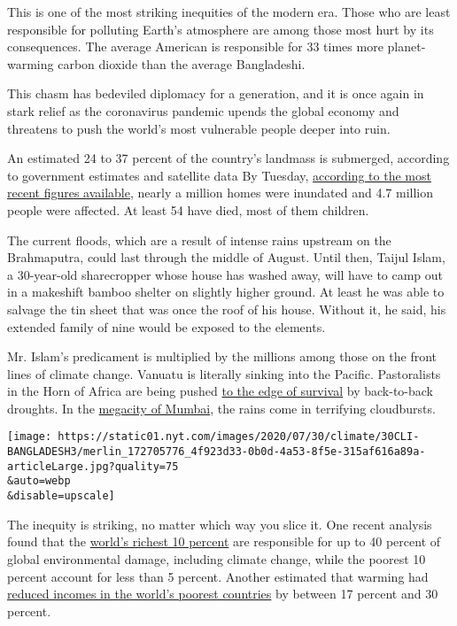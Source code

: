 This is one of the most striking inequities of the modern era. Those who
are least responsible for polluting Earth's atmosphere are among those
most hurt by its consequences. The average American is responsible for
33 times more planet-warming carbon dioxide than the average
Bangladeshi.

This chasm has bedeviled diplomacy for a generation, and it is once
again in stark relief as the coronavirus pandemic upends the global
economy and threatens to push the world's most vulnerable people deeper
into ruin.

An estimated 24 to 37 percent of the country's landmass is submerged,
according to government estimates and satellite data By Tuesday,
\href{https://reliefweb.int/disaster/fl-2020-000161-bgd}{according to
the most recent figures available,} nearly a million homes were
inundated and 4.7 million people were affected. At least 54 have died,
most of them children.

The current floods, which are a result of intense rains upstream on the
Brahmaputra, could last through the middle of August. Until then, Taijul
Islam, a 30-year-old sharecropper whose house has washed away, will have
to camp out in a makeshift bamboo shelter on slightly higher ground. At
least he was able to salvage the tin sheet that was once the roof of his
house. Without it, he said, his extended family of nine would be exposed
to the elements.

Mr. Islam's predicament is multiplied by the millions among those on the
front lines of climate change. Vanuatu is literally sinking into the
Pacific. Pastoralists in the Horn of Africa are being pushed
\href{https://www.nytimes.com/2018/03/12/climate/kenya-drought.html}{to
the edge of survival} by back-to-back droughts. In the
\href{https://www.nytimes.com/interactive/2019/11/25/climate/india-monsoon-drought.html}{megacity
of Mumbai}, the rains come in terrifying cloudbursts.

\texttt{[image: https://static01.nyt.com/images/2020/07/30/climate/30CLI-BANGLADESH3/merlin\_172705776\_4f923d33-0b0d-4a53-8f5e-315af616a89a-articleLarge.jpg?quality=75\\\&auto=webp\\\&disable=upscale]}

The inequity is striking, no matter which way you slice it. One recent
analysis found that the
\href{https://www.nature.com/articles/s41467-020-16941-y}{world's
richest 10 percent} are responsible for up to 40 percent of global
environmental damage, including climate change, while the poorest 10
percent account for less than 5 percent. Another estimated that warming
had
\href{https://www.nytimes.com/2019/04/22/climate/climate-change-global-wealth-gap.html}{reduced
incomes in the world's poorest countries} by between 17 percent and 30
percent.

